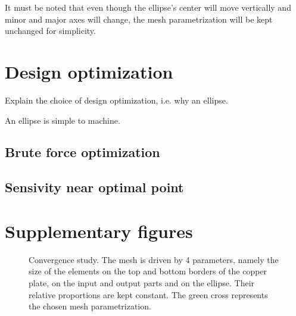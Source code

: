 \documentclass[]{article}
\begin{document}
It must be noted that even though the ellipse's center will move vertically and minor and major axes will change,
the mesh parametrization will be kept unchanged for simplicity.


\section{Design optimization}

Explain the choice of design optimization, i.e. why an ellipse.

An ellipse is simple to machine.

\subsection{Brute force optimization}

\subsection{Sensivity near optimal point}

\pagebreak

\section{Supplementary figures}

\begin{figure}[h]
    \centering
    
    \caption{
        Convergence study.
        The mesh is driven by 4 parameters, namely the size of the elements on the top and bottom borders of the copper plate,
        on the input and output parts and on the ellipse.
        Their relative proportions are kept constant.
        The \textcolor{darkpastelgreen}{green cross} represents the chosen mesh parametrization.
    }
    \label{figure:mesh-convergence}
\end{figure}
\end{document}
